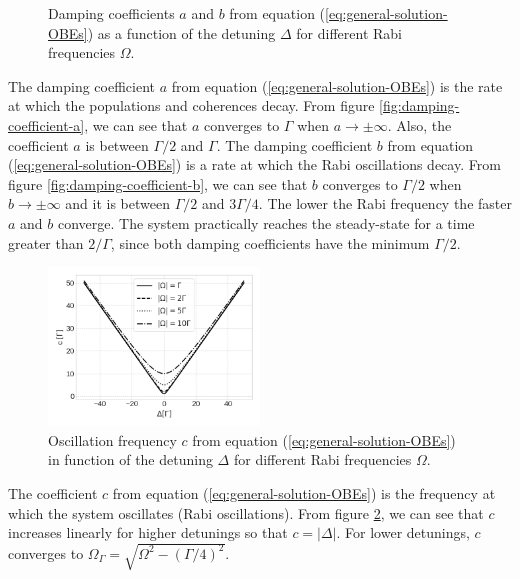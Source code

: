 {\begin{figure}[H]
	\caption{Damping coefficients $ a $ and $ b $ from equation (\ref{eq:general-solution-OBEs}) as a function of the detuning $ \Delta $ for different Rabi frequencies $ \Omega $.}
	\label{fig:damping-coefficients}
\end{figure}
The damping coefficient $ a $ from equation (\ref{eq:general-solution-OBEs}) is the rate at which the populations and coherences decay. From figure \ref{fig:damping-coefficient-a}, we can see that $ a $ converges to $ \Gamma $ when $ a \rightarrow \pm \infty $. Also, the coefficient $ a $ is between $ \Gamma/2 $ and $ \Gamma $. The damping coefficient $ b $ from equation (\ref{eq:general-solution-OBEs}) is a rate at which the Rabi oscillations decay. From figure \ref{fig:damping-coefficient-b}, we can see that $ b $ converges to $ \Gamma / 2 $ when $ b \rightarrow \pm \infty $ and it is between $ \Gamma / 2 $ and $ 3\Gamma/4 $. The lower the Rabi frequency the faster $ a $ and $ b $ converge. The system practically reaches the steady-state for a time greater than $ 2 / \Gamma $, since both damping coefficients have the minimum $ \Gamma / 2 $.

\begin{figure}[!ht]
	\centering
	\vspace{-10pt}
	\includegraphics[width=0.5\textwidth]{USPSC-img/oscillation_frequency_c.png}
	\caption{Oscillation frequency $ c $ from equation (\ref{eq:general-solution-OBEs}) in function of the detuning $ \Delta $ for different Rabi frequencies $ \Omega $.}
	\label{fig:oscillation-frequency-c}
	\vspace{-15pt}
\end{figure}

The coefficient $ c $ from equation (\ref{eq:general-solution-OBEs}) is the frequency at which the system oscillates (Rabi oscillations). From figure \ref{fig:oscillation-frequency-c}, we can see that $ c $ increases linearly for higher detunings so that $ c = |\Delta| $. For lower detunings, $ c $ converges to $ \Omega_{\Gamma} = \sqrt{\Omega^2 - (\Gamma/4)^2} $.

}

